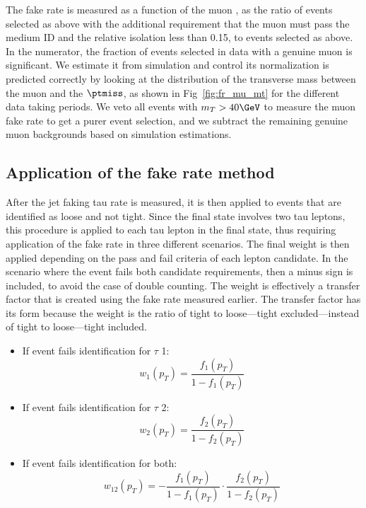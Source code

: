 The fake rate is measured as a function of the muon \pt, as the ratio of events selected as above with the additional
requirement that the muon must pass the medium ID and the relative isolation less than 0.15, to events selected as
above. In the numerator, the fraction of events selected in data with a genuine muon is significant. We estimate
it from simulation and control its normalization is predicted correctly by looking at the distribution of the
transverse mass between the muon and the $\ptmiss$, as shown in Fig~\ref{fig:fr_mu_mt} for the different
data taking periods.
We veto all events with $m_T>40\GeV$ to measure the muon fake rate to get a purer
event selection, and we subtract the remaining genuine muon backgrounds based on simulation estimations.

\subsection{Application of the fake rate method}

After the jet faking tau rate is measured, it is then applied to events that are identified as loose and not tight. Since the final state involves two tau leptons, this procedure is applied to each tau lepton in the final state, thus requiring application of the fake rate in three different scenarios. The final weight is then applied depending on the pass and fail criteria of each lepton candidate. In the scenario where the event fails both candidate requirements, then a minus sign is included, to avoid the case of double counting.  
 The weight is effectively a transfer factor that is created using the fake rate measured earlier. The transfer factor has its form because the weight is the ratio of tight to loose---tight excluded---instead of tight to loose---tight included. 
\begin{itemize}
\item{If event fails identification for $\tau$ 1:\begin{equation}\label{eq:frw} w_1(p_T)=\frac{f_{1}(p_T)}{1-f_{1}(p_T)}\end{equation}}
\item{If event fails identification for $\tau$ 2:\begin{equation}w_2(p_T)=\frac{f_{2}(p_T)}{1-f_{2}(p_T)}\end{equation}}
\item{If event fails identification for both:\begin{equation}w_{12}(p_T)=-\frac{f_{1}(p_T)}{1-f_{1}(p_T)}\cdot\frac{f_{2}(p_T)}{1-f_{2}(p_T)}\end{equation}}
\end{itemize}

